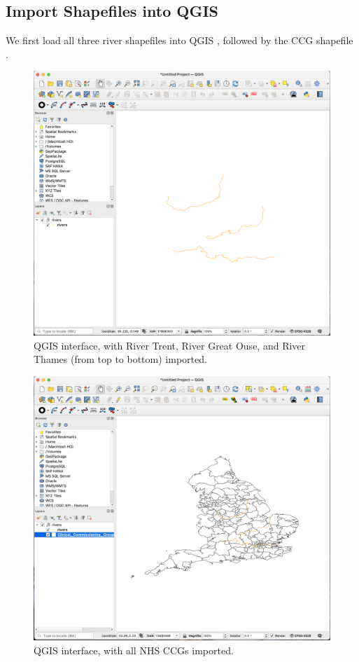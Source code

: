 \documentclass[Afour,sagev,times]{sagej}
\begin{document}
\subsection{Import Shapefiles into QGIS}
We first load all three river shapefiles into QGIS , followed by the CCG shapefile .

{
\begin{figure}[H]
    \centering
    \includegraphics[width=\columnwidth]{import_rivers.png}
    \caption{QGIS interface, with River Trent, River Great Ouse, and River Thames (from top to bottom) imported.}
    \label{fig:import_rivers}
\end{figure}

\begin{figure}[H]
    \centering
    \includegraphics[width=\columnwidth]{import_ccgs.png}
    \caption{QGIS interface, with all NHS CCGs imported.}
    \label{fig:import_ccgs}
\end{figure}

}
\end{document}
